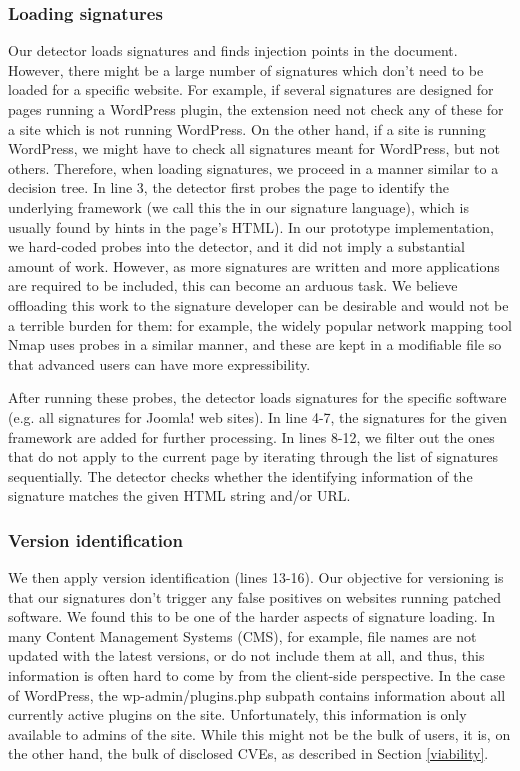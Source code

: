 \subsubsection{Loading signatures} \label{loading_signatures}
Our detector loads signatures and finds injection points in the document. However, there might be a large number of signatures which don't need to be loaded for a specific website. For example, if several signatures are designed for pages running a WordPress plugin, the extension need not check any of these for a site which is not running WordPress. On the other hand, if a site is running WordPress, we might have to check all signatures meant for WordPress, but not others. Therefore, when loading signatures, we proceed in a manner similar to a decision tree. In line 3, the detector first probes the page to identify the underlying framework (we call this the  in our signature language), which is usually found by hints in the page's HTML). In our prototype implementation, we hard-coded probes into the detector, and it did not imply a substantial amount of work. However, as more signatures are written and more applications are required to be included, this can become an arduous task. We believe offloading this work to the signature developer can be desirable and would not be a terrible burden for them: for example, the widely popular network mapping tool Nmap \cite{nMap} uses probes in a similar manner, and these are kept in a modifiable file so that advanced users can have more expressibility. 

After running these probes, the detector loads signatures for the specific software (e.g. all signatures for Joomla! web sites). In line 4-7, the signatures for the given framework are added for further processing. In lines 8-12, we filter out the ones that do not apply to the current page by iterating through the list of signatures sequentially. The detector checks whether the identifying information of the signature matches the given HTML string and/or URL.

\subsubsection{Version identification} \label{versioning}
We then apply version identification (lines 13-16). Our objective for versioning is that our signatures don't trigger any false positives on websites running patched software. We found this to be one of the harder aspects of signature loading. In many Content Management Systems (CMS), for example, file names are not updated with the latest versions, or do not include them at all, and thus, this information is often hard to come by from the client-side perspective. In the case of WordPress, the wp-admin/plugins.php subpath contains information about all currently active plugins on the site. Unfortunately, this information is only available to admins of the site. While this might not be the bulk of users, it is, on the other hand, the bulk of disclosed CVEs, as described in Section \ref{viability}.

